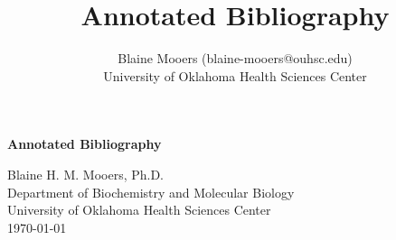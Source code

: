\documentclass[11pt]{article}
\title{Annotated Bibliography}
\author{Blaine Mooers (blaine-mooers@ouhsc.edu)\\University of Oklahoma Health Sciences Center}
\begin{document}
\begin{center}
{
\Large\textbf{Annotated Bibliography}
\medskip

   { \large   Blaine H. M. Mooers, Ph.D. \\
\medskip
Department of Biochemistry and Molecular Biology \\
\medskip
University of Oklahoma Health Sciences Center \\
\medskip
\today}
}
\end{center}

\nocite{*}


\end{document}
